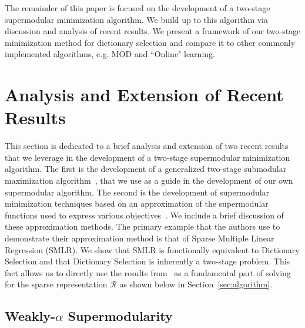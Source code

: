 \documentclass{article}
\newcommand{\Rr}{\mathcal{R}}
\begin{document}
\noindent The remainder of this paper is focused on the development of a two-stage supermodular minimization algorithm. We build up to this algorithm via discussion and analysis of recent results. We present a framework of our two-stage minimization method for dictionary selection and compare it to other commonly implemented algorithms, e.g. MOD and  ``Online" learning.

\section{Analysis and Extension of Recent Results}\label{sec:recentresults}

This section is dedicated to a brief analysis and extension of two recent results that we leverage in the development of a two-stage supermodular minimization algorithm. The first is the development of a generalized two-stage submodular maximization algorithm~\cite{Singer16TwoStage}, that we use as a guide in the development of our own supermodular algorithm. The second is the development of supermodular minimization techniques based on an approximation of the supermodular functions used to express various objectives~\cite{weaklyalpha}. We include a brief discussion of these approximation methods. The primary example that the authors use to demonstrate their approximation method is that of Sparse Multiple Linear Regression (SMLR). We show that SMLR is functionally equivalent to Dictionary Selection and that Dictionary Selection is inherently a two-stage problem. This fact allows us to directly use the results from~\cite{weaklyalpha} as a fundamental part of solving for the sparse representation $\Rr$ as shown below in Section~\ref{sec:algorithm}.

\subsection{Weakly-$\alpha$ Supermodularity} \label{weakalpha}
\end{document}
